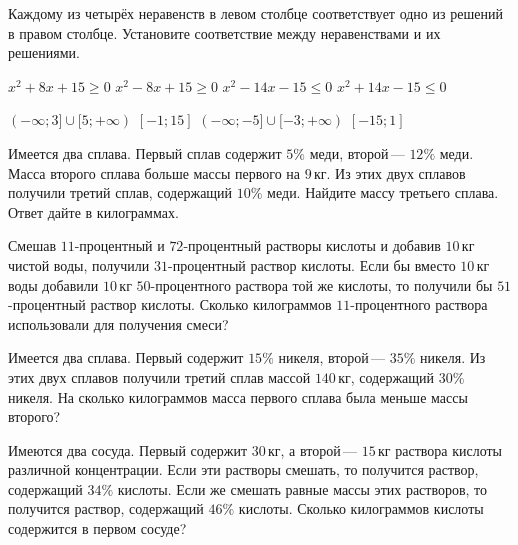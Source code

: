 \begin{homework}[number=3]
	\begin{listofex}
		\item Каждому из четырёх неравенств в левом столбце соответствует одно из решений в правом столбце. Установите соответствие между неравенствами и их решениями. \\
		\begin{minipage}[t]{0.45\linewidth}
			\begin{tasks}
				\task \( x^2+8x+15 \ge 0 \)
				\task \( x^2 - 8x + 15 \ge 0 \)
				\task \( x^2 - 14x - 15 \le 0 \)
				\task \( x^2 + 14x - 15 \le 0 \)
			\end{tasks}
		\end{minipage}
		\hspace{0.02\linewidth}
		\begin{minipage}[t]{0.45\linewidth}
			\begin{tasks}
				\task \( (- \infty; 3 ] \cup [5; + \infty ) \)
				\task \([-1; 15]  \)
				\task \(  (- \infty; -5 ] \cup [-3; + \infty ) \)
				\task \( [-15; 1] \)
			\end{tasks}
		\end{minipage}
		\item Имеется два сплава. Первый сплав содержит \(5\%\) меди, второй --- \(12\%\) меди. Масса второго сплава больше массы первого на \(9\) кг. Из этих двух сплавов получили третий сплав, содержащий \(10\%\) меди. Найдите массу третьего сплава. Ответ дайте в килограммах.
		\item Смешав \(11\)-процентный и \(72\)-процентный растворы кислоты и добавив \(10\) кг чистой воды, получили \(31\)-процентный раствор кислоты. Если бы вместо \(10\) кг воды добавили \(10\) кг \(50\)-процентного раствора той же кислоты, то получили бы \(51\)-процентный раствор кислоты. Сколько килограммов \(11\)-процентного раствора использовали для получения смеси?
		\item Имеется два сплава. Первый содержит \(15\%\) никеля, второй --- \(35\%\) никеля. Из этих двух сплавов получили третий сплав массой \(140\) кг, содержащий \(30\%\) никеля. На сколько килограммов масса первого сплава была меньше массы второго?
		\item Имеются два сосуда. Первый содержит \(30\) кг, а второй --- \(15\) кг раствора кислоты различной концентрации. Если эти растворы смешать, то получится раствор, содержащий \(34\%\) кислоты. Если же смешать равные массы этих растворов, то получится раствор, содержащий \(46\%\) кислоты. Сколько килограммов кислоты содержится в первом сосуде?
	\end{listofex}
\end{homework}

